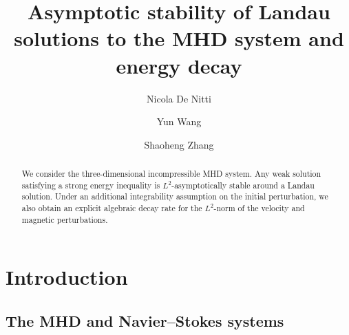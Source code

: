 \documentclass[10pt]{amsart}
\makeatletter
\theoremstyle{plain}
\theoremstyle{definition}
\theoremstyle{remark}
\numberwithin{equation}{section}
\newcommand{\hlg@math}[1]{%
  \begingroup
  \setlength{\fboxsep}{0.6pt}%
  \mathchoice
    {\colorbox{yellow!25}{$\displaystyle #1$}}%
    {\colorbox{yellow!25}{$\textstyle #1$}}%
    {\colorbox{yellow!25}{$\scriptstyle #1$}}%
    {\colorbox{yellow!25}{$\scriptscriptstyle #1$}}%
  \endgroup
}
\DeclareRobustCommand{\hlg}[1]{%
  \begingroup
  \sethlcolor{yellow!25}%
  \ifmmode
    \hlg@math{#1}%
  \else
    \hl{#1}%
  \fi
  \endgroup
}
\makeatother
\begin{document}


\title[Landau solutions for MHD]{Asymptotic stability of Landau solutions to the MHD system and energy decay}

\author[N.~De Nitti]{Nicola De Nitti}
\address[N.~De Nitti]{Università di Pisa, Dipartimento di Matematica, Largo Bruno Pontecorvo 5, 56127 Pisa, Italy.}

\author[Y.~Wang]{Yun Wang}
\address[Y.~Wang]{Soochow University, School of Mathematical Sciences, Center for dynamical systems and differential equations, 215006 Suzhou, P.\,R.~China.}

\author[S.~Zhang]{Shaoheng Zhang}
\address[S.~Zhang]{Soochow University, School of Mathematical Sciences, 215006 Suzhou, P.\,R.~China.}



\begin{abstract}
We consider the three-dimensional incompressible MHD system. Any weak solution satisfying a strong energy inequality is $L^2$-asymptotically stable around a Landau solution.
Under an additional integrability assumption on the initial perturbation, we also obtain an explicit algebraic decay rate for the $L^2$-norm of the velocity and magnetic perturbations.

\end{abstract}

\maketitle



\section{Introduction}
\label{sec:intro}


\subsection{The MHD and Navier--Stokes systems}\label{ssec:mhd}
\end{document}
